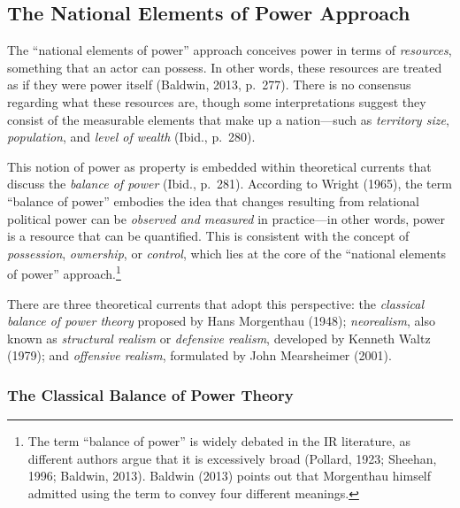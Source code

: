 \subsection{The National Elements of Power Approach}

The ``national elements of power'' approach conceives power in terms of \textit{resources}, something that an actor can possess. In other words, these resources are treated as if they were power itself (Baldwin, 2013, p.~277). There is no consensus regarding what these resources are, though some interpretations suggest they consist of the measurable elements that make up a nation---such as \textit{territory size}, \textit{population}, and \textit{level of wealth} (Ibid., p.~280).

This notion of power as property is embedded within theoretical currents that discuss the \textit{balance of power} (Ibid., p.~281). According to Wright (1965), the term ``balance of power'' embodies the idea that changes resulting from relational political power can be \textit{observed and measured} in practice---in other words, power is a resource that can be quantified. This is consistent with the concept of \textit{possession}, \textit{ownership}, or \textit{control}, which lies at the core of the ``national elements of power'' approach.\footnote{The term ``balance of power'' is widely debated in the IR literature, as different authors argue that it is excessively broad (Pollard, 1923; Sheehan, 1996; Baldwin, 2013). Baldwin (2013) points out that Morgenthau himself admitted using the term to convey four different meanings.}

There are three theoretical currents that adopt this perspective: the \textit{classical balance of power theory} proposed by Hans Morgenthau (1948); \textit{neorealism}, also known as \textit{structural realism} or \textit{defensive realism}, developed by Kenneth Waltz (1979); and \textit{offensive realism}, formulated by John Mearsheimer (2001).


\subsubsection{The Classical Balance of Power Theory}

